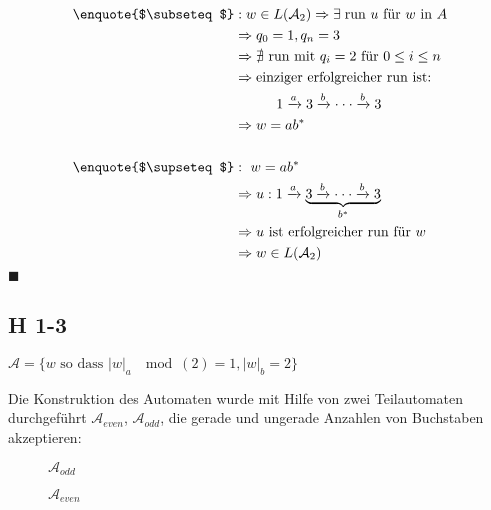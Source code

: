 \documentclass{scrartcl}
\begin{document}
\begin{align*}
    \text{\enquote{$\subseteq$}}&: w \in L(\mathcal{A}_2) \Rightarrow \exists \text{\;run $u$ für $w$ in $A$}\\&\Rightarrow q_0 = 1, q_n = 3\\
    &\Rightarrow \nexists \text{ run mit } q_i = 2 \text{ für } 0 \leq i \leq n\\
    &\Rightarrow \text{einziger erfolgreicher run ist:}\\
    &\hspace{3em} 1 \xrightarrow{a} 3 \xrightarrow{b} \cdot\cdot\cdot \xrightarrow{b} 3\\
    &\Rightarrow w = ab^*\\
    \\
    \text{\enquote{$\supseteq$}} &:\ w = ab^*\\
    &\Rightarrow u: 1 \xrightarrow{a} \underbrace{3 \xrightarrow{b} \cdot\cdot\cdot \xrightarrow{b} 3}_{b^*}\\
    &\Rightarrow \text{$u$ ist erfolgreicher run für $w$}\\
    &\Rightarrow w \in L(\mathcal{A}_2)\\
\end{align*}
\hfill$\blacksquare$

\subsection{H 1-3}

$\mathcal{A} = \{w\text{ so dass }|w|_a\;\mod(2)=1, |w|_b=2\}$

\newcommand{\odd}{\mathcal{A}_{odd}}
\newcommand{\even}{\mathcal{A}_{even}}

Die Konstruktion des Automaten wurde mit Hilfe von zwei Teilautomaten durchgeführt $\even$, $\odd$, die gerade und ungerade Anzahlen von Buchstaben akzeptieren:

\begin{figure}[ht]
\centering
{}
\caption*{$\odd{}$}
\end{figure}

\begin{figure}[ht]
\centering
{}
\caption*{$\even{}$}
\end{figure}
\end{document}
